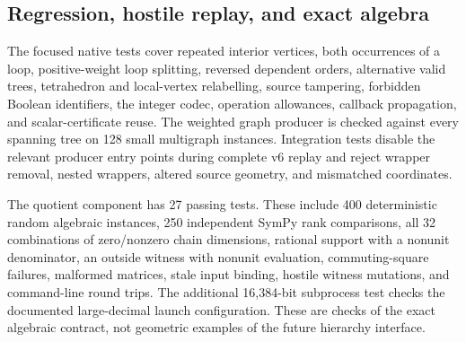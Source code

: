 \subsection{Regression, hostile replay, and exact algebra}



The focused native tests cover repeated interior vertices, both occurrences
of a loop, positive-weight loop splitting, reversed dependent orders,
alternative valid trees, tetrahedron and local-vertex relabelling,
source tampering, forbidden Boolean identifiers, the integer codec,
operation allowances, callback propagation, and scalar-certificate reuse.
The weighted graph producer is checked against every spanning tree on
128 small multigraph instances. Integration tests disable the relevant
producer entry points during complete v6 replay and reject wrapper removal,
nested wrappers, altered source geometry, and mismatched coordinates.

The quotient component has 27 passing tests. These include 400 deterministic
random algebraic instances, 250 independent SymPy rank comparisons, all
32 combinations of zero/nonzero chain dimensions, rational support with
a nonunit denominator, an outside witness with nonunit evaluation,
commuting-square failures, malformed matrices, stale input binding,
hostile witness mutations, and command-line round trips. The additional
16,384-bit subprocess test checks the documented large-decimal launch
configuration. These are checks of the exact algebraic contract, not
geometric examples of the future hierarchy interface.
